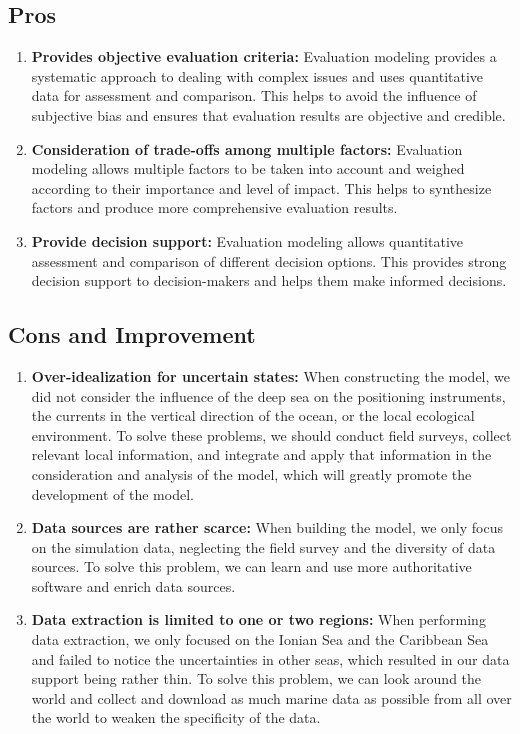 \documentclass[12pt]{article}
\begin{document}
\subsection{Pros}

\begin{enumerate}
    \item \textbf{Provides objective evaluation criteria:} Evaluation modeling provides a systematic approach to dealing with complex issues and uses quantitative data for assessment and comparison. This helps to avoid the influence of subjective bias and ensures that evaluation results are objective and credible.
    \item \textbf{Consideration of trade-offs among multiple factors: }Evaluation modeling allows multiple factors to be taken into account and weighed according to their importance and level of impact. This helps to synthesize factors and produce more comprehensive evaluation results.
    \item \textbf{Provide decision support:} Evaluation modeling allows quantitative assessment and comparison of different decision options. This provides strong decision support to decision-makers and helps them make informed decisions.
\end{enumerate}

\subsection{Cons and Improvement}

\begin{enumerate}
    \item \textbf{Over-idealization for uncertain states:} When constructing the model, we did not consider the influence of the deep sea on the positioning instruments, the currents in the vertical direction of the ocean, or the local ecological environment. To solve these problems, we should conduct field surveys, collect relevant local information, and integrate and apply that information in the consideration and analysis of the model, which will greatly promote the development of the model.
    \item \textbf{Data sources are rather scarce:} When building the model, we only focus on the simulation data, neglecting the field survey and the diversity of data sources. To solve this problem, we can learn and use more authoritative software and enrich data sources.
    \item \textbf{Data extraction is limited to one or two regions:} When performing data extraction, we only focused on the Ionian Sea and the Caribbean Sea and failed to notice the uncertainties in other seas, which resulted in our data support being rather thin. To solve this problem, we can look around the world and collect and download as much marine data as possible from all over the world to weaken the specificity of the data.
\end{enumerate}
\end{document}

